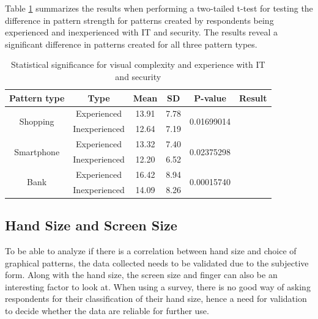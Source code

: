     Table \ref{tab:statsigComplexityExperience} summarizes the results when performing a two-tailed t-test for testing the difference in pattern strength for patterns created by respondents being experienced and inexperienced with IT and security. The results reveal a significant difference in patterns created for all three pattern types.

    \begin{table}[H]
    \centering
      \begin{tabular}{ c | c | c | c | c | c }
      \hline
        {\bf Pattern type} & {\bf Type} & {\bf Mean} & {\bf SD} & {\bf P-value} & {\bf Result} \\ \hline
        \multirow{2}{*}{Shopping}   & Experienced   & 13.91 & 7.78 & \multirow{2}{*}{0.01699014} & \multirow{2}{*}{\bf \color{olive}{Significant}} \\
                                    & Inexperienced & 12.64 & 7.19 & & \\ \hline
        \multirow{2}{*}{Smartphone} & Experienced   & 13.32 & 7.40 & \multirow{2}{*}{0.02375298} & \multirow{2}{*}{\bf \color{olive}{Significant}} \\
                                    & Inexperienced & 12.20 & 6.52 & & \\ \hline
        \multirow{2}{*}{Bank}       & Experienced   & 16.42 & 8.94 & \multirow{2}{*}{0.00015740} & \multirow{2}{*}{\bf \color{olive}{Significant}} \\
                                    & Inexperienced & 14.09 & 8.26 & & \\ \hline
      \end{tabular}
      \caption{Statistical significance for visual complexity and experience with IT and security}
      \label{tab:statsigComplexityExperience}
    \end{table}

  \subsection{Hand Size and Screen Size}\label{sec:classificationhandsizescreensize}
    To be able to analyze if there is a correlation between hand size and choice of graphical patterns, the data collected needs to be validated due to the subjective form. Along with the hand size, the screen size and finger can also be an interesting factor to look at. When using a survey, there is no good way of asking respondents for their classification of their hand size, hence a need for validation to decide whether the data are reliable for further use. 

